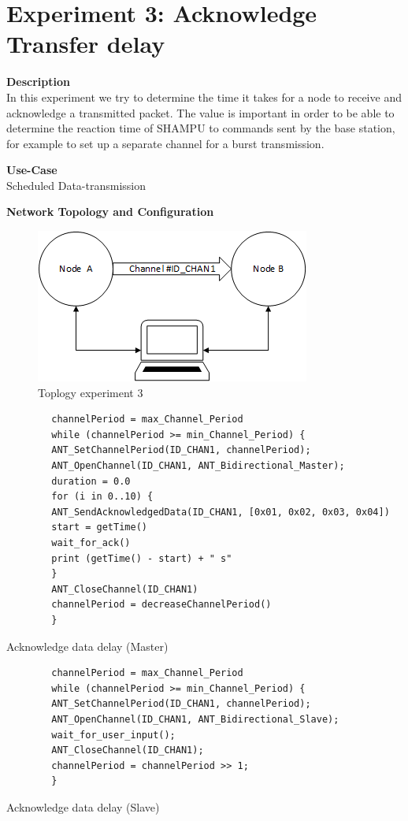\section{Experiment 3: Acknowledge Transfer delay}
\begin{description} 
	\item{\textbf{Description}} \hfill \\ In this experiment we try to determine the time it takes for a node to receive and acknowledge a transmitted packet. The value is important in order to be able to determine the reaction time of SHAMPU to commands sent by the base station, for example to set up a separate channel for a burst transmission.
	\item{\textbf{Use-Case}} \hfill \\ Scheduled Data-transmission
	\item{\textbf{Network Topology and Configuration}} \hfill \\ 
	\begin{figure}[H]
		\centering
		\includegraphics[scale=1]{content/images/exp_topo.png}
		\caption{Toplogy experiment 3}
	\end{figure}
	\begin{code}[H]
		\begin{verbatim}
		channelPeriod = max_Channel_Period
		while (channelPeriod >= min_Channel_Period) {
		ANT_SetChannelPeriod(ID_CHAN1, channelPeriod);
		ANT_OpenChannel(ID_CHAN1, ANT_Bidirectional_Master);
		duration = 0.0
		for (i in 0..10) {
		ANT_SendAcknowledgedData(ID_CHAN1, [0x01, 0x02, 0x03, 0x04])
		start = getTime()	   
		wait_for_ack()		
		print (getTime() - start) + " s"	  
		}
		ANT_CloseChannel(ID_CHAN1)		
		channelPeriod = decreaseChannelPeriod()
		} 
		\end{verbatim}
		\caption{Acknowledge data delay (Master)}\label{lst:mExp3}
	\end{code}
	
	\begin{code}[H]
		\begin{verbatim}
		channelPeriod = max_Channel_Period
		while (channelPeriod >= min_Channel_Period) {
		ANT_SetChannelPeriod(ID_CHAN1, channelPeriod);
		ANT_OpenChannel(ID_CHAN1, ANT_Bidirectional_Slave);				 
		wait_for_user_input();
		ANT_CloseChannel(ID_CHAN1);
		channelPeriod = channelPeriod >> 1;
		}
		\end{verbatim}
		\caption{Acknowledge data delay (Slave)}\label{lst:sExp3}
	\end{code}
	

\end{description}
